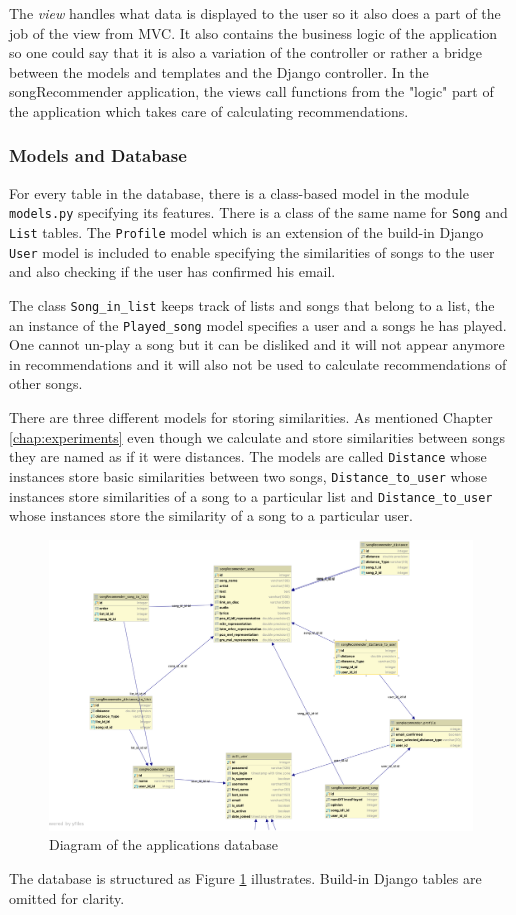 The \textit{view} handles what data is displayed to the user so it also does a part of the job of the view from MVC. It also contains the business logic of the application so one could say that it is also a variation of the controller or rather a bridge between the models and templates and the Django controller. In the songRecommender application, the views call functions from the "logic" part of the application which takes care of calculating recommendations.


\subsubsection{Models and Database}
For every table in the database, there is a class-based model in the module \texttt{models.py} specifying its features. There is a class of the same name for \texttt{Song} and \texttt{List} tables. The \texttt{Profile} model which is an extension of the build-in Django \texttt{User} model is included to enable specifying the similarities of songs to the user and also checking if the user has confirmed his email.
 
The class \texttt{Song\_in\_list} keeps track of lists and songs that belong to a list, the an instance of the \texttt{Played\_song} model specifies a user and a songs he has played. One cannot un-play a song but it can be disliked and it will not appear anymore in recommendations and it will also not be used to calculate recommendations of other songs. 

There are three different models for storing similarities. As mentioned Chapter \ref{chap:experiments} even though we calculate and store similarities between songs they are named as if it were distances. The models are called \texttt{Distance} whose instances store basic similarities between two songs, \texttt{Distance\_to\_user} whose instances store similarities of a song to a particular list and \texttt{Distance\_to\_user} whose instances store the similarity of a song to a particular user. 
\begin{figure}[ht]
    \centering
	\includegraphics[width=120mm]{./img/postgres_databaze.png}
	\caption{Diagram of the applications database}
	\label{fig:diagram}
\end{figure}
The database is structured as Figure \ref{fig:diagram} illustrates. Build-in Django tables are omitted for clarity.

